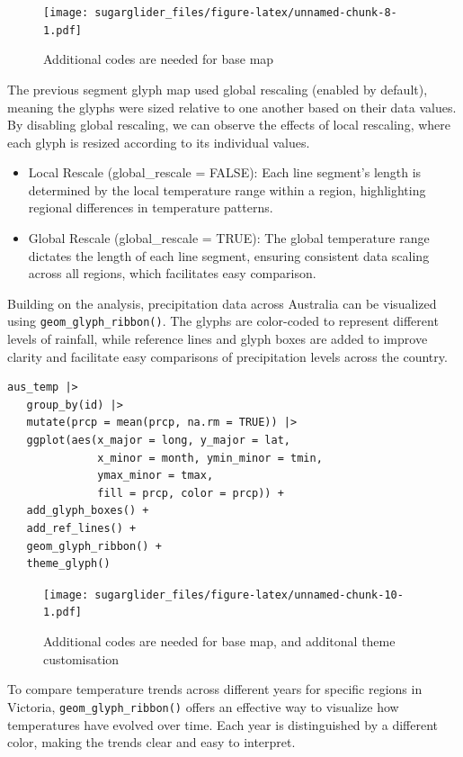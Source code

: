 \begin{figure}
\centering
\texttt{[image: sugarglider\_files/figure-latex/unnamed-chunk-8-1.pdf]}
\caption{\label{fig:unnamed-chunk-8}Additional codes are needed for base map}
\end{figure}

The previous segment glyph map used global rescaling (enabled by default), meaning the glyphs were sized relative to one another based on their data values. By disabling global rescaling, we can observe the effects of local rescaling, where each glyph is resized according to its individual values.

\begin{itemize}
\tightlist
\item
  Local Rescale (global\_rescale = FALSE): Each line segment's length is determined by the local temperature range within a region, highlighting regional differences in temperature patterns.
\item
  Global Rescale (global\_rescale = TRUE): The global temperature range dictates the length of each line segment, ensuring consistent data scaling across all regions, which facilitates easy comparison.
\end{itemize}

Building on the analysis, precipitation data across Australia can be visualized using \texttt{geom\_glyph\_ribbon()}. The glyphs are color-coded to represent different levels of rainfall, while reference lines and glyph boxes are added to improve clarity and facilitate easy comparisons of precipitation levels across the country.

\begin{verbatim}
aus_temp |>
   group_by(id) |>
   mutate(prcp = mean(prcp, na.rm = TRUE)) |>
   ggplot(aes(x_major = long, y_major = lat,
              x_minor = month, ymin_minor = tmin,
              ymax_minor = tmax, 
              fill = prcp, color = prcp)) +
   add_glyph_boxes() +
   add_ref_lines() +
   geom_glyph_ribbon() +
   theme_glyph()
\end{verbatim}

\begin{figure}
\centering
\texttt{[image: sugarglider\_files/figure-latex/unnamed-chunk-10-1.pdf]}
\caption{\label{fig:unnamed-chunk-10}Additional codes are needed for base map, and additonal theme customisation}
\end{figure}

To compare temperature trends across different years for specific regions in Victoria, \texttt{geom\_glyph\_ribbon()} offers an effective way to visualize how temperatures have evolved over time. Each year is distinguished by a different color, making the trends clear and easy to interpret.

